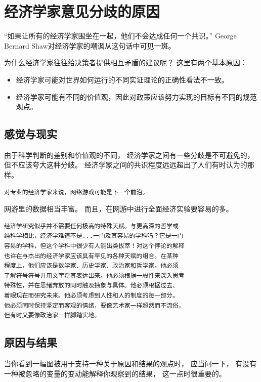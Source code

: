 \section{经济学家意见分歧的原因}

“如果让所有的经济学家围坐在一起，他们不会达成任何一个共识。”
George Bernard Shaw对经济学家的嘲讽从这句话中可见一斑。


为什么经济学家往往给决策者提供相互矛盾的建议呢？
这里有两个基本原因：
\begin{itemize}
\item 经济学家可能对世界如何运行的不同实证理论的正确性看法不一致。
\item 经济学家可能有不同的价值观，因此对政策应该努力实现的目标有不同的规范观点。
\end{itemize}


\subsection{感觉与现实}


由于科学判断的差别和价值观的不同，
经济学家之间有一些分歧是不可避免的，
但不应该夸大这种分歧。
经济学家之间的共识程度远远超出了人们有时认为的那样。


\begin{verbatim}
对专业的经济学家来说，网络游戏可能是下一个前沿。
\end{verbatim}
网游里的数据相当丰富。
而且，在网游中进行全面经济实验要容易的多。



\begin{verbatim}
经济学研究似乎并不需要任何极高的特殊天赋。与更高深的哲学或
纯科学相比，经济学难道不是...一门及其容易的学科吗？它是一门
容易的学科，但这个学科中很少有人能出类拔萃！对这个悖论的解释
也许在与杰出的经济学家应该具有罕见的各种天赋的组合。在某种
程度上，他们应该是数学家、历史学家、政治家和哲学家。他必须
了解符号符号并用文字将其表达出来。他必须根据一般性来深入思考
特殊性，并在思绪奔放的同时触及抽象与具体。他必须根据过去、
着眼现在而研究未来。他必须考虑到人性和人的制度的每一部分。
他必须同时保持坚定而客观的情绪，要像艺术家一样超然而不流俗，
但有时又要像政治家一样脚踏实地。
\end{verbatim}


\subsection{原因与结果}

当你看到一幅图被用于支持一种关于原因和结果的观点时，
应当问一下，
有没有一种被忽略的变量的变动能解释你观察到的结果，
这一点时很重要的。


